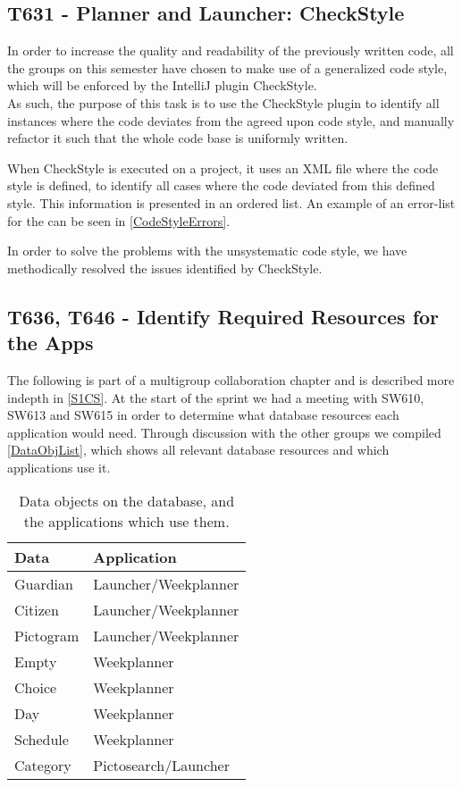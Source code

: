 \subsection{T631 - Planner and Launcher: CheckStyle}
In order to increase the quality and readability of the previously written code,
all the groups on this semester have chosen to make use of a generalized code
style, which will be enforced by the IntelliJ plugin CheckStyle.\\
As such, the purpose of this task is to use the CheckStyle plugin to identify
all instances where the code deviates from the agreed upon code style, and
manually refactor it such that the whole code base is uniformly written.\nl

When CheckStyle is executed on a project, it uses an XML file where the code
style is defined, to identify all cases where the code deviated from this
defined style. This information is presented in an ordered list. An example of
an error-list for the  can be seen in
\autoref{CodeStyleErrors}.


In order to solve the problems with the unsystematic code style, we have
methodically resolved the issues identified by CheckStyle.
		
\subsection{T636, T646 - Identify Required Resources for the
Apps}\label{ReqResources} The following is part of a multigroup collaboration
chapter and is described more indepth in \autoref{S1CS}. At the start of
the sprint we had a meeting with SW610, SW613 and SW615 in order to determine
what database resources each application would need. Through discussion with
the other groups we compiled \autoref{DataObjList}, which shows all relevant
database resources and which applications use it.

\begin{table}[H]
\centering
\begin{tabular}{|l|l|} 
\hline
\textbf{Data}	& \textbf{Application}	\\\hline
Guardian		& Launcher/Weekplanner 	\\\hline
Citizen    	   	& Launcher/Weekplanner 	\\\hline 
Pictogram 		& Launcher/Weekplanner 	\\\hline 
Empty    	   	& Weekplanner 			\\\hline
Choice   	   	& Weekplanner  			\\\hline
Day   	   		& Weekplanner 			\\\hline
Schedule  	   	& Weekplanner			\\\hline
Category       	& Pictosearch/Launcher	\\\hline
\end{tabular}
\caption{Data objects on the database, and the applications which use them.} 
\label{DataObjList}    
\end{table}

